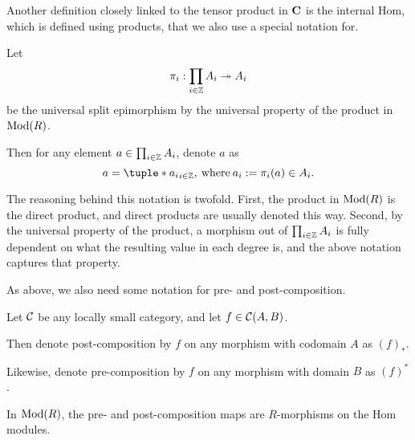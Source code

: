 Another definition closely linked to the tensor product in \( \operatorname{\mathbf{C}} \) is the internal Hom, which is defined using products, that we also use a special notation for.
\begin{notation}
    \label{not:prod}
    Let 
    \[
        \pi_i: \prod_{i \in {\mathbb{Z}}} A_i \twoheadrightarrow A_i
    \]
    be the universal split epimorphism by the universal property of the product in \( \operatorname{Mod}(R) \).
    
    Then for any element \( a \in \prod_{i \in {\mathbb{Z}}} A_i \), denote \( a \) as
    \[
        a = \tuple*{a_i}_{i \in \Zb}, \: \text{where} \: a_i := \pi_i(a) \in A_i.
    \]
\end{notation}

The reasoning behind this notation is twofold. First, the product in \( \operatorname{Mod}(R) \) is the direct product, and direct products are usually denoted this way. Second, by the universal property of the product, a morphism out of \( \prod_{i \in {\mathbb{Z}}} A_i \) is fully dependent on what the resulting value in each degree is, and the above notation captures that property.

As above, we also need some notation for pre- and post-composition.
\begin{notation}
    Let \( {\mathcal{C}} \) be any locally small category, and let \( f \in {\mathcal{C}}(A, B) \).

    Then denote post-composition by \( f \) on any morphism with codomain \( A \) as \( (f)_* \).

    Likewise, denote pre-composition by \( f \) on any morphism with domain \( B \) as \( (f)^* \).
\end{notation}
In \( \operatorname{Mod}(R) \), the pre- and post-composition maps are \( R \)-morphisms on the Hom modules.

